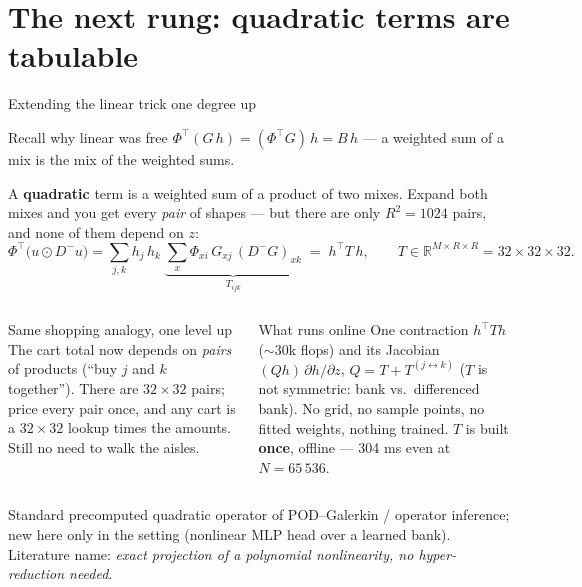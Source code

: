 \documentclass[10pt,aspectratio=169]{beamer}
\newcommand{\T}{^{\top}}
\newcommand{\R}{\mathbb{R}}
\begin{document}
\section{The next rung: quadratic terms are tabulable}
\begin{frame}{Extending the linear trick one degree up}
  \begin{block}{Recall why linear was free}
    \centering $\Phi\T(G\,h) = (\Phi\T G)\,h = B\,h$ --- a weighted sum of a mix is the mix of the weighted sums.
  \end{block}
  \footnotesize A \textbf{quadratic} term is a weighted sum of a product of two mixes. Expand both mixes and you get every \emph{pair} of shapes --- but there are only $R^2 = 1024$ pairs, and none of them depend on $z$:
  \[
    \Phi\T\big(u \odot D^- u\big)
    = \sum_{j,k} h_j\,h_k\;\underbrace{\sum_x \Phi_{xi}\,G_{xj}\,(D^-G)_{xk}}_{T_{ijk}}
    \;=\; h\T T\, h ,\qquad T \in \R^{M\times R\times R} = 32\times32\times32 .
  \]
  \begin{columns}[T]
    \begin{exampleblock}{Same shopping analogy, one level up}
      \footnotesize The cart total now depends on \emph{pairs} of products (``buy $j$ and $k$ together''). There are $32\times32$ pairs; price every pair once, and any cart is a $32\times32$ lookup times the amounts. Still no need to walk the aisles.
    \end{exampleblock}
    \begin{block}{What runs online}
      \footnotesize One contraction $h\T T h$ ($\sim$30k flops) and its Jacobian $(Qh)\,\partial h/\partial z$, $Q = T + T^{(j\leftrightarrow k)}$ ($T$ is not symmetric: bank vs.\ differenced bank). No grid, no sample points, no fitted weights, nothing trained. $T$ is built \textbf{once}, offline --- 304 ms even at $N = 65\,536$.
    \end{block}
  \end{columns}
  \scriptsize Standard precomputed quadratic operator of POD--Galerkin / operator inference; new here only in the setting (nonlinear MLP head over a learned bank). Literature name: \emph{exact projection of a polynomial nonlinearity, no hyper-reduction needed}.
\end{frame}
\end{document}
